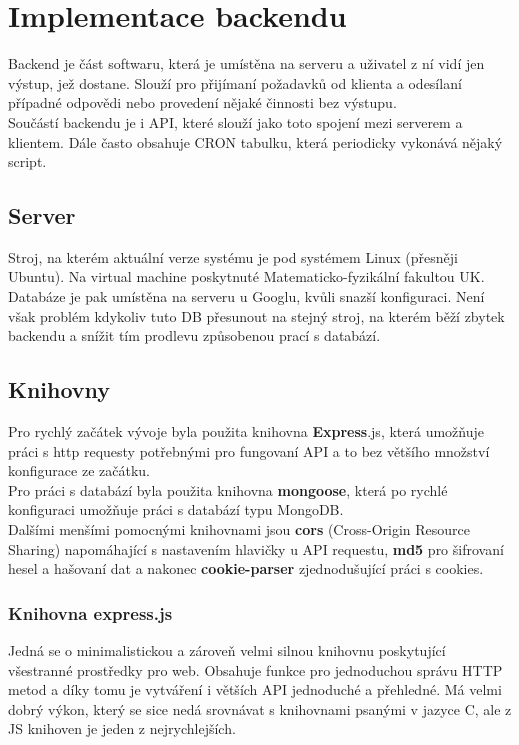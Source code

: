 \chapter{Implementace backendu}
Backend je část softwaru, která je umístěna na serveru a uživatel
z ní vidí jen výstup, jež dostane. Slouží pro přijímaní požadavků od
klienta a odesílaní případné odpovědi nebo provedení nějaké činnosti bez výstupu. 
\\
Součástí backendu je i API, které slouží jako toto spojení mezi
serverem a klientem. Dále často obsahuje CRON tabulku, která periodicky
vykonává nějaký script.

\section{Server}
Stroj, na kterém  aktuální verze systému je pod systémem Linux (přesněji Ubuntu).
Na virtual machine poskytnuté Matematicko-fyzikální fakultou UK.
\\
Databáze je pak umístěna na serveru u Googlu, kvůli snazší konfiguraci.
Není však problém kdykoliv tuto DB přesunout na stejný stroj, na kterém běží
zbytek backendu a snížit tím prodlevu způsobenou prací s databází.


\section{Knihovny}
Pro rychlý začátek vývoje byla použita knihovna \textbf{Express}.js, která
umožňuje práci s http requesty potřebnými pro fungovaní API a to 
bez většího množství konfigurace ze začátku.
\\
Pro práci s databází byla použita knihovna \textbf{mongoose}, která po rychlé konfiguraci
umožňuje práci s databází typu MongoDB.
\\
Dalšími menšími pomocnými knihovnami jsou
\textbf{cors} (Cross-Origin Resource Sharing) napomáhající s nastavením hlavičky u API requestu,
\textbf{md5} pro šifrovaní hesel a hašovaní dat a nakonec
\textbf{cookie-parser} zjednodušující práci s cookies.

\subsection{Knihovna express.js}
Jedná se o minimalistickou a zároveň velmi silnou knihovnu poskytující všestranné prostředky pro web.
Obsahuje funkce pro jednoduchou správu HTTP metod a díky tomu je vytváření i větších API jednoduché a přehledné.
Má velmi dobrý výkon, který se sice nedá srovnávat s knihovnami psanými v jazyce C, ale
z JS knihoven je jeden z nejrychlejších.

